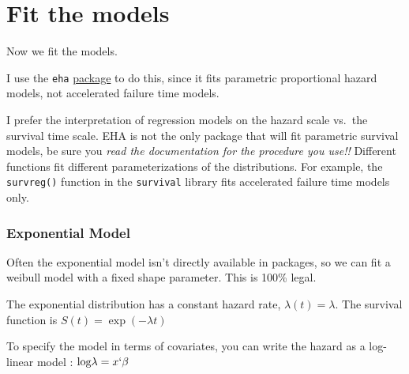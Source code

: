 \documentclass[
]{article}
\newenvironment{Shaded}{\begin{snugshade}}{\end{snugshade}}
\newcommand{\CommentTok}[1]{\textcolor[rgb]{0.56,0.35,0.01}{\textit{#1}}}
\newcommand{\DataTypeTok}[1]{\textcolor[rgb]{0.13,0.29,0.53}{#1}}
\newcommand{\DecValTok}[1]{\textcolor[rgb]{0.00,0.00,0.81}{#1}}
\newcommand{\FloatTok}[1]{\textcolor[rgb]{0.00,0.00,0.81}{#1}}
\newcommand{\KeywordTok}[1]{\textcolor[rgb]{0.13,0.29,0.53}{\textbf{#1}}}
\newcommand{\NormalTok}[1]{#1}
\newcommand{\OperatorTok}[1]{\textcolor[rgb]{0.81,0.36,0.00}{\textbf{#1}}}
\newcommand{\StringTok}[1]{\textcolor[rgb]{0.31,0.60,0.02}{#1}}
\begin{document}
\hypertarget{fit-the-models}{%
\section{Fit the models}\label{fit-the-models}}

Now we fit the models.

I use the \texttt{eha}
\href{http://cran.r-project.org/web/packages/eha/index.html}{package} to
do this, since it fits parametric proportional hazard models, not
accelerated failure time models.

I prefer the interpretation of regression models on the hazard scale
vs.~the survival time scale. EHA is not the only package that will fit
parametric survival models, be sure you \emph{read the documentation for
the procedure you use!!} Different functions fit different
parameterizations of the distributions. For example, the
\texttt{survreg()} function in the \texttt{survival} library fits
accelerated failure time models only.

\hypertarget{exponential-model}{%
\subsubsection{Exponential Model}\label{exponential-model}}

Often the exponential model isn't directly available in packages, so we
can fit a weibull model with a fixed shape parameter. This is 100\%
legal.

The exponential distribution has a constant hazard rate,
\(\lambda (t) = \lambda\). The survival function is
\(S(t) = \exp (-\lambda t)\)

To specify the model in terms of covariates, you can write the hazard as
a log-linear model : \(\text{log} \lambda = x`\beta\)

\begin{Shaded}
\end{Shaded}
\end{document}
